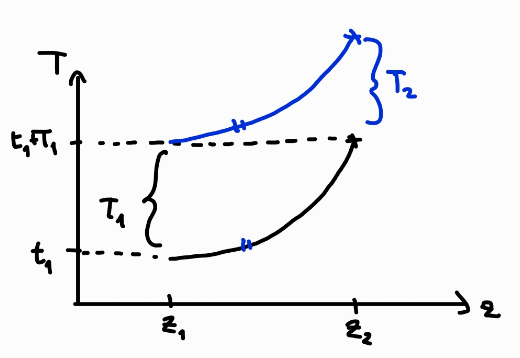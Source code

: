 \begin{center}
    \includegraphics[scale=0.3]{Chapitres/1. Introduction/Images/confusion pure temp.png}
\end{center}
